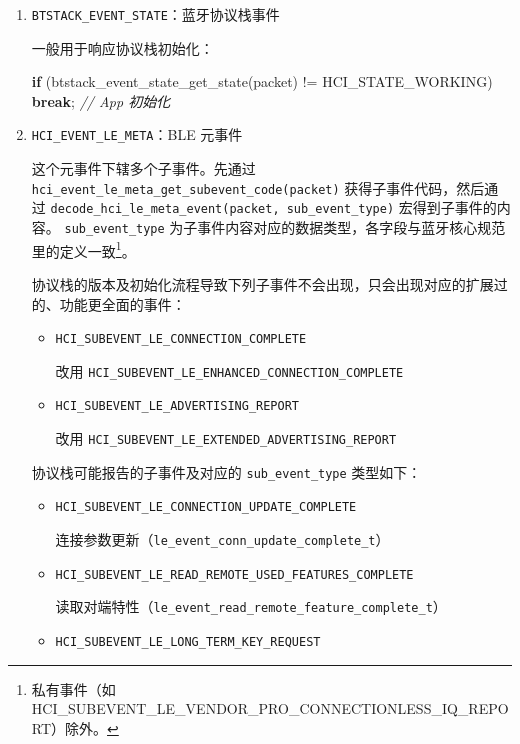 \documentclass[
  12pt,
]{book}
\newenvironment{Shaded}{\begin{snugshade}}{\end{snugshade}}
\newcommand{\CommentTok}[1]{\textcolor[rgb]{0.56,0.35,0.01}{\textit{#1}}}
\newcommand{\ControlFlowTok}[1]{\textcolor[rgb]{0.13,0.29,0.53}{\textbf{#1}}}
\newcommand{\NormalTok}[1]{#1}
\begin{document}
\begin{enumerate}
\def\labelenumi{\arabic{enumi}.}
\item
  \texttt{BTSTACK\_EVENT\_STATE}：蓝牙协议栈事件

  一般用于响应协议栈初始化：

\begin{Shaded}
\begin{Highlighting}[]
\ControlFlowTok{if}\NormalTok{ (btstack_event_state_get_state(packet) != HCI_STATE_WORKING)}
    \ControlFlowTok{break}\NormalTok{;}
\CommentTok{// App 初始化}
\end{Highlighting}
\end{Shaded}
\item
  \texttt{HCI\_EVENT\_LE\_META}：BLE 元事件

  这个元事件下辖多个子事件。先通过 \texttt{hci\_event\_le\_meta\_get\_subevent\_code(packet)} 获得子事件代码，然后通过
  \texttt{decode\_hci\_le\_meta\_event(packet,\ sub\_event\_type)} 宏得到子事件的内容。
  \texttt{sub\_event\_type} 为子事件内容对应的数据类型，各字段与蓝牙核心规范里的定义一致\footnote{私有事件（如 HCI\_SUBEVENT\_LE\_VENDOR\_PRO\_CONNECTIONLESS\_IQ\_REPORT）除外。}。

  协议栈的版本及初始化流程导致下列子事件不会出现，只会出现对应的扩展过的、功能更全面的事件：

  \begin{itemize}
  \item
    \texttt{HCI\_SUBEVENT\_LE\_CONNECTION\_COMPLETE}

    改用 \texttt{HCI\_SUBEVENT\_LE\_ENHANCED\_CONNECTION\_COMPLETE}
  \item
    \texttt{HCI\_SUBEVENT\_LE\_ADVERTISING\_REPORT}

    改用 \texttt{HCI\_SUBEVENT\_LE\_EXTENDED\_ADVERTISING\_REPORT}
  \end{itemize}

  协议栈可能报告的子事件及对应的 \texttt{sub\_event\_type} 类型如下：

  \begin{itemize}
  \item
    \texttt{HCI\_SUBEVENT\_LE\_CONNECTION\_UPDATE\_COMPLETE}

    连接参数更新（\texttt{le\_event\_conn\_update\_complete\_t}）
  \item
    \texttt{HCI\_SUBEVENT\_LE\_READ\_REMOTE\_USED\_FEATURES\_COMPLETE}

    读取对端特性（\texttt{le\_event\_read\_remote\_feature\_complete\_t}）
  \item
    \texttt{HCI\_SUBEVENT\_LE\_LONG\_TERM\_KEY\_REQUEST}


\end{itemize}
\end{enumerate}
\end{document}
